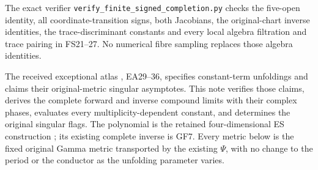 \documentclass[11pt]{article}
\begin{document}
The exact verifier
\texttt{verify\_finite\_signed\_completion.py} checks the
five-open identity, all coordinate-transition signs,
both Jacobians, the original-chart inverse identities,
the trace-discriminant constants and every local
algebra filtration and trace pairing in FS21--27.
No numerical fibre sampling replaces those algebra identities.

The received exceptional atlas \cite{ExceptionalAtlas}, EA29--36, specifies
constant-term unfoldings and claims their original-metric singular
asymptotes. This note verifies those claims, derives the complete
forward and inverse compound limits with their complex phases,
evaluates every multiplicity-dependent constant, and determines
the original singular flags. The polynomial is the retained
four-dimensional ES construction \cite{ES488}; its existing complete
inverse is GF7. Every metric below is the fixed original Gamma
metric transported by the existing \(\Psi\), with no change to
the period or the conductor as the unfolding parameter varies.
\end{document}

